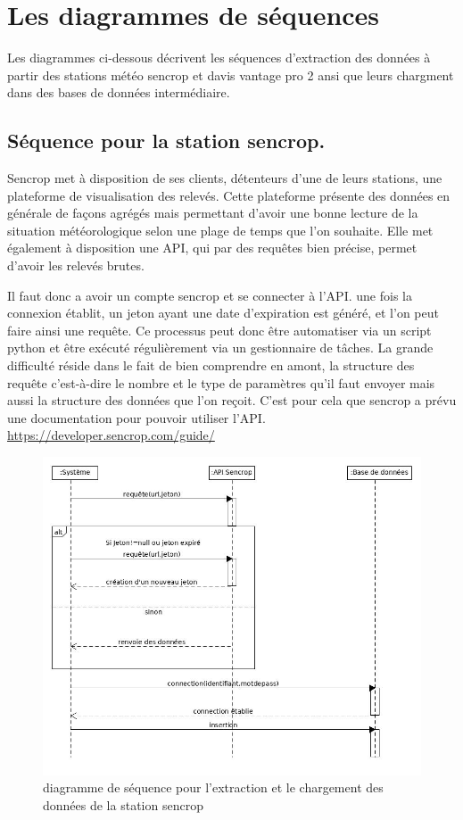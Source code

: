 \section{Les diagrammes de séquences}
 
Les diagrammes ci-dessous décrivent les séquences d’extraction des données à partir des stations météo sencrop et davis vantage pro 2 ansi que leurs chargment dans des bases de données intermédiaire. 
\subsection{Séquence pour la station sencrop.}
Sencrop met à disposition de ses clients, détenteurs d’une de leurs stations, une plateforme de visualisation des relevés. Cette plateforme présente des données en générale de façons agrégés mais permettant d’avoir une bonne lecture de la situation météorologique selon une plage de temps que l’on souhaite. Elle met également à disposition une API, qui par des requêtes bien précise, permet d’avoir les relevés brutes.  

Il faut donc a avoir un compte sencrop et se connecter à l’API. une fois la connexion établit, un jeton ayant une date d’expiration est généré, et l’on peut faire ainsi une requête. Ce processus peut donc être automatiser via un script python et être exécuté régulièrement via un gestionnaire de tâches. La grande difficulté réside dans le fait de bien comprendre en amont, la structure des requête c’est-à-dire le nombre et le type de paramètres qu’il faut envoyer mais aussi la structure des données que l’on reçoit. C’est pour cela que sencrop a prévu une documentation pour pouvoir utiliser l’API. 
\newline
\url{https://developer.sencrop.com/guide/}  
\begin{figure}[!h]
    \label{diagramme de séquence stéation sencrop}
    \centering
     \includegraphics[width=.7\textwidth]{images/sencrop_senquence_diagrame.jpg}
    \caption{diagramme de séquence pour l'extraction et le chargement des données de la station sencrop}
  
\end{figure}

